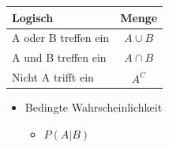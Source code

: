 \documentclass[11pt,twoside,landscape]{article}
\begin{document}
\begin{multicols}{3}
\begin{center}
\begin{tabular}{ll}
Logisch & Menge\\
\hline
A oder B treffen ein & $$A \cup B$$\\
A und B treffen ein & $$A \cap B$$\\
Nicht A trifft ein & $$A^C$$\\
\end{tabular}
\end{center}

\begin{itemize}
\item Bedingte Wahrscheinlichkeit
\begin{itemize}
\item \(P(A|B)\)
\end{itemize}
\end{itemize}


\end{multicols}
\end{document}
